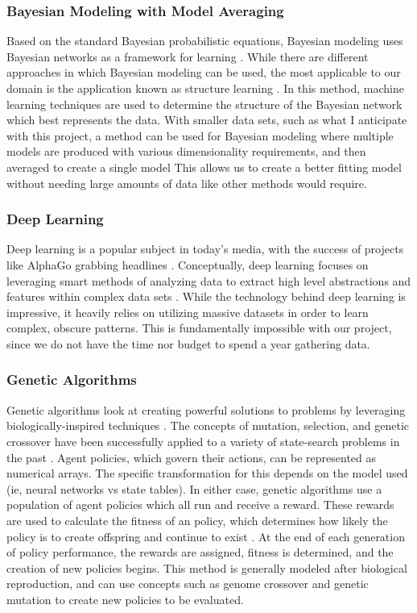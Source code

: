 \subsubsection{Bayesian Modeling with Model Averaging}
Based on the standard Bayesian probabilistic equations, Bayesian modeling uses Bayesian networks as a framework for learning \cite{RussellNorvig}.
While there are different approaches in which Bayesian modeling can be used, the most applicable to our domain is the application known as structure learning \cite{RussellNorvig}.
In this method, machine learning techniques are used to determine the structure of the Bayesian network which best represents the data.
With smaller data sets, such as what I anticipate with this project, a method can be used for Bayesian modeling where multiple models are produced with various dimensionality requirements, and then averaged to create a single model \cite{RussellNorvig}
This allows us to create a better fitting model without needing large amounts of data like other methods would require.

\subsubsection{Deep Learning}
Deep learning is a popular subject in today's media, with the success of projects like AlphaGo grabbing headlines \cite{alphago}.
Conceptually, deep learning focuses on leveraging smart methods of analyzing data to extract high level abstractions and features within complex data sets \cite{Goodfellow-et-al-2016-Book}.
While the technology behind deep learning is impressive, it heavily relies on utilizing massive datasets in order to learn complex, obscure patterns.
This is fundamentally impossible with our project, since we do not have the time nor budget to spend a year gathering data.

\subsubsection{Genetic Algorithms}
Genetic algorithms look at creating powerful solutions to problems by leveraging biologically-inspired techniques \cite{RussellNorvig}.
The concepts of mutation, selection, and genetic crossover have been successfully applied to a variety of state-search problems in the past \cite{RussellNorvig}.
Agent policies, which govern their actions, can be represented as numerical arrays.
The specific transformation for this depends on the model used (ie, neural networks vs state tables).
In either case, genetic algorithms use a population of agent policies which all run and receive a reward.
These rewards are used to calculate the fitness of an policy, which determines how likely the policy is to create offspring and continue to exist \cite{RussellNorvig}.
At the end of each generation of policy performance, the rewards are assigned, fitness is determined, and the creation of new policies begins.
This method is generally modeled after biological reproduction, and can use concepts such as genome crossover and genetic mutation to create new policies to be evaluated.

